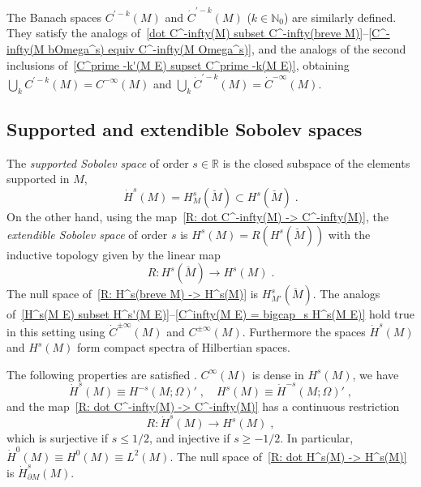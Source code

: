 \documentclass{memo-l}
\theoremstyle{plain}
\theoremstyle{definition}
\theoremstyle{remark}
\newcommand{\N}{\mathbb{N}}
\newcommand{\R}{\mathbb{R}}
\numberwithin{section}{chapter}
\numberwithin{equation}{section}%
\begin{document}
The Banach spaces $C^{\prime-k}(M)$ and $\dot C^{\prime-k}(M)$ ($k\in\N_0$)  are similarly defined. They satisfy the analogs of~\eqref{dot C^-infty(M) subset C^-infty(breve M)}--\eqref{C^-infty(M bOmega^s) equiv C^-infty(M Omega^s)}, and the analogs of the second inclusions of~\eqref{C^prime -k'(M E) supset C^prime -k(M E)}, obtaining $\bigcup_kC^{\prime-k}(M)=C^{-\infty}(M)$ and $\bigcup_k\dot C^{\prime-k}(M)=\dot C^{-\infty}(M)$.



\subsection{Supported and extendible Sobolev spaces}\label{ss: supported and extendible Sobolev sps} 

The \emph{supported Sobolev space}  of order $s\in\R$ is the closed subspace of the elements supported in $M$, 
\begin{equation}\label{dot H^s(M) subset H^s(breve M)}
\dot H^s(M)=H^s_M(\breve M)\subset H^s(\breve M)\;.
\end{equation}
On the other hand, using the map~\eqref{R: dot C^-infty(M) -> C^-infty(M)}, the \emph{extendible Sobolev space}  of order $s$ is $H^s(M)=R(H^s(\breve M))$ with the inductive topology given by the linear map
\begin{equation}\label{R: H^s(breve M) -> H^s(M)}
R:H^s(\breve M)\to H^s(M)\;.
\end{equation}
The null space of~\eqref{R: H^s(breve M) -> H^s(M)} is $H^s_{M'}(\breve M)$. The analogs of~\eqref{H^s(M E) subset H^s'(M E)}--\eqref{C^infty(M E) = bigcap_s H^s(M E)} hold true in this setting using $\dot C^{\pm\infty}(M)$ and $C^{\pm\infty}(M)$.  Furthermore the spaces $\dot H^s(M)$ and $H^s(M)$ form compact spectra of Hilbertian spaces.

The following properties are satisfied \cite[Proposition~3.5.1]{Melrose1996}. $C^\infty(M)$ is dense in $H^s(M)$, we have
\begin{equation}\label{dot H^s(M) equiv H^-s(M Omega)'}
\dot H^s(M)\equiv H^{-s}(M;\Omega)'\;,\quad H^s(M)\equiv\dot H^{-s}(M;\Omega)'\;,
\end{equation}
and the map~\eqref{R: dot C^-infty(M) -> C^-infty(M)} has a continuous restriction
\begin{equation}\label{R: dot H^s(M) -> H^s(M)}
R:\dot H^s(M)\to H^s(M)\;,
\end{equation}
which is surjective if $s\le1/2$, and injective if $s\ge-1/2$. In particular, $\dot H^0(M)\equiv H^0(M)\equiv L^2(M)$. The null space of~\eqref{R: dot H^s(M) -> H^s(M)} is $\dot H^s_{\partial M}(M)$.
\end{document}
